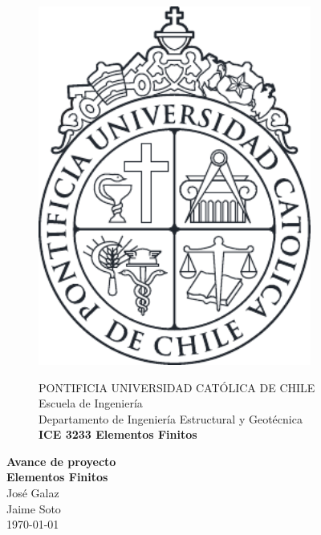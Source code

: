 \documentclass[10pt]{article}
\theoremstyle{definition}
\theoremstyle{remark}
\theoremstyle{definition}
\begin{document}
%   
  \begin{titlepage}
    \begin{figure}
      \begin{minipage}{2.5cm}
	\includegraphics[width=0.8\textwidth]{./figuras/LogoUC-BN}
      \end{minipage}
      \begin{minipage}{14.5cm}
	\vspace{4mm}
	{\sc PONTIFICIA UNIVERSIDAD CAT\'OLICA DE CHILE}\\
	Escuela de Ingenier\'ia\\
	Departamento de Ingenier\'ia Estructural y Geot\'ecnica\\
	{\bf ICE 3233 Elementos Finitos}\\
	\vspace{0mm}
	\hrulefill
      \end{minipage}
    \end{figure}
    \phantom{""}\vspace{60mm}

    \begin{center}
      \Huge{\textbf{Avance de proyecto \\ Elementos Finitos}}\vspace{95mm}\\
      \raggedleft \Large{Jos\'e Galaz \\ Jaime Soto} \\ \today\\ 
    \end{center}
  \end{titlepage}
  
\end{document}
